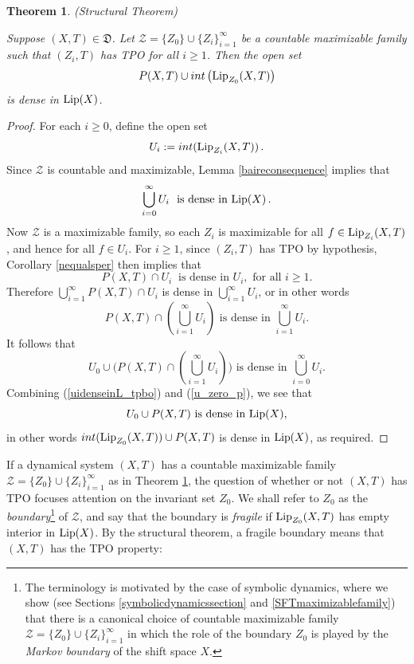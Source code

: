 \documentclass[reqno,11pt]{amsart}
\newtheorem{thm}{Theorem}[section]
\theoremstyle{definition}
\theoremstyle{remark}
\theoremstyle{remark}
\def\lip{{\rm Lip}}
\def\ZZ{\mathcal{Z}}
\def\D{\mathfrak{D}}
\numberwithin{equation}{section}
\begin{document}
\begin{thm}\label{abstracttpovariant}  (Structural Theorem)


\noindent 
Suppose $(X,T)\in\D$.
Let $\ZZ=\{Z_0\} \cup \{Z_i\}_{i=1}^\infty$ be a countable maximizable family
 such that $(Z_i,T)$ has TPO for all $i\ge1$. 
Then the open set
$$P(X,T) \cup int\left(\lip_{Z_0}(X,T)\right)$$ 
is dense in $\lip(X)$.
\end{thm}
\begin{proof}
For each $i\ge0$, define the open set
$$U_i:=int(\lip_{Z_i}(X,T))\,.
$$
Since $\ZZ$ is countable and maximizable,
Lemma \ref{baireconsequence} implies that
\begin{equation}\label{uidenseinL_tpbo}
\bigcup_{i=0}^\infty U_i\ \text{ is dense in }\lip(X)\,.
\end{equation}
Now $\ZZ$ is a maximizable family, so each $Z_i$ is maximizable for all $f\in \lip_{Z_i}(X,T)$, and hence for all
$f\in U_i$. 
For $i\ge1$,  since 
$(Z_i,T)$ has TPO 
by hypothesis, 
 Corollary \ref{nequalsper} then implies that
\begin{equation*}
P(X,T) \cap U_i\ \text{ is dense in }U_i,\text{ for all }i\ge 1.
\end{equation*}
Therefore
$\bigcup_{i=1}^\infty P(X,T)\cap U_i$ is dense in $\bigcup_{i=1}^\infty U_i$,
or in other words
\begin{equation*}
P(X,T) \cap \left( \bigcup_{i=1}^\infty  U_i\right) \text{ is dense in } \bigcup_{i=1}^\infty U_i.
\end{equation*}
It follows that
\begin{equation}\label{u_zero_p}
U_0 \cup \big( P(X,T) \cap \left( \bigcup_{i=1}^\infty  U_i\right) \big) \text{ is dense in } \bigcup_{i=0}^\infty U_i.
\end{equation}
Combining (\ref{uidenseinL_tpbo})
and (\ref{u_zero_p}), we see that
\begin{equation*}
U_0 \cup P(X,T) \text{ is dense in } \lip(X),
\end{equation*}
in other words $int(\lip_{Z_0}(X,T)) \cup P(X,T)$ is dense in $\lip(X)$, as required.
\end{proof}

If a dynamical system $(X,T)$ has a countable maximizable family $\ZZ=\{Z_0\} \cup \{Z_i\}_{i=1}^\infty$ as in Theorem \ref{abstracttpovariant}, the question of whether or not $(X,T)$ has TPO focuses attention on the invariant set $Z_0$.
We shall refer to $Z_0$ as the \emph{boundary}\footnote{The terminology is motivated by the case of symbolic dynamics,
where we show (see Sections \ref{symbolicdynamicssection} and \ref{SFTmaximizablefamily}) that there is a canonical choice of countable maximizable family $\ZZ=\{Z_0\} \cup \{Z_i\}_{i=1}^\infty$ in which the role of the boundary $Z_0$ is played by the \emph{Markov boundary} of the shift space $X$.}
 of $\ZZ$, and say that the boundary is \emph{fragile} if
$\lip_{Z_0}(X,T)$ has empty interior in $\lip(X)$.
By the structural theorem, a fragile boundary means that $(X,T)$ has the TPO property:
\end{document}
